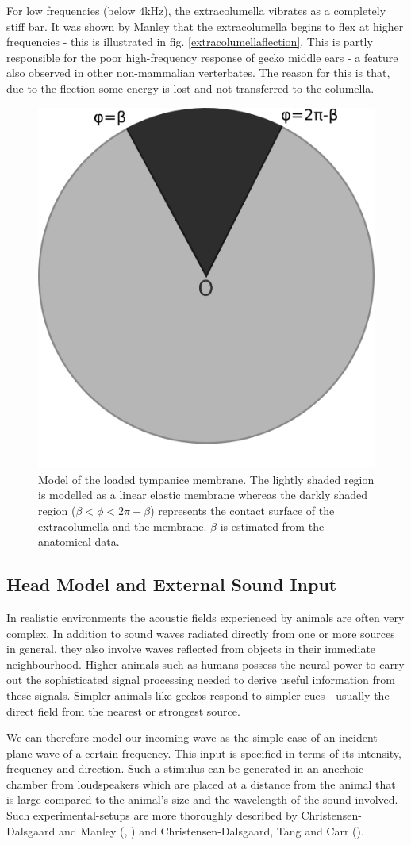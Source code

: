 For low frequencies (below $4$kHz), the extracolumella 
vibrates as a completely stiff bar. It was shown by Manley \cite{manleygecko2} that the extracolumella begins to flex at higher frequencies - 
this is illustrated in fig. \ref{extracolumellaflection}. This is partly responsible for the poor high-frequency response of gecko middle ears - 
a feature also observed in other non-mammalian verterbates. The reason for this is that, due to the flection some energy is lost and
not transferred to the columella.

\begin{figure}[ht]
 \centering
 \includegraphics[width=.4\linewidth]{Diagrams/extracolumella2.png}
 \caption[Tympanic membrane model]{Model of the loaded tympanice membrane. The lightly shaded region is modelled as a linear elastic membrane whereas the darkly shaded region 
 ($\beta<\phi<2\pi-\beta$) represents the contact surface of the extracolumella and the membrane. $\beta$ is estimated from the anatomical data.}
\end{figure}


\subsection{Head Model and External Sound Input}\label{soundinput}
In realistic environments the acoustic fields experienced by animals are often very complex.
In addition to sound waves radiated directly from one or more sources in general, they also involve
waves reflected from objects in their immediate neighbourhood. Higher animals such as humans
possess the neural power to carry out the sophisticated signal processing needed to derive useful
information from these signals. Simpler animals like geckos respond to simpler cues - usually
the direct field from the nearest or strongest source.

We can therefore model our incoming wave as the simple case of an incident plane wave of a 
certain frequency. This input is specified in terms of its intensity, frequency and direction.
Such a stimulus can be generated in an anechoic chamber from loudspeakers which are placed at
a distance from the animal that is large compared to the animal's size and the wavelength
of the sound involved. Such experimental-setups are more thoroughly described by 
Christensen-Dalsgaard and Manley (\cite{dalsgaardmanley1}, \cite{dalsgaardmanley2}) and 
Christensen-Dalsgaard, Tang and Carr (\cite{dalsgaardtangcarr}).

